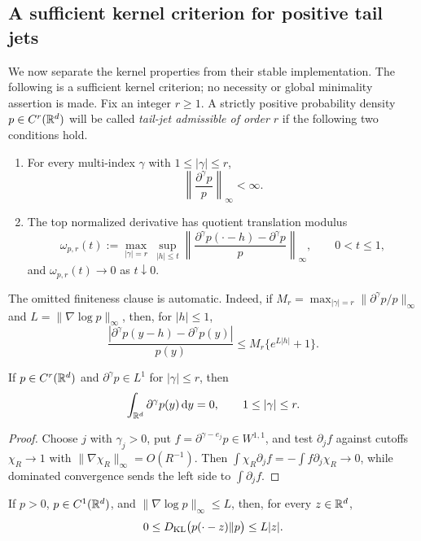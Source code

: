 \subsection{A sufficient kernel criterion for positive tail jets}
\label{subsec:abstract-positive-tail-jet-kernel}

We now separate the kernel properties from their stable implementation.  The
following is a sufficient kernel criterion; no necessity or global
minimality assertion is made.  Fix an integer \(r\ge1\).  A strictly positive
probability density \(p\in C^r(\mathbb{R}^d)\) will be called \emph{tail-jet
admissible of order \(r\)} if the following two conditions hold.
\begin{enumerate}[label=\textup{(K\arabic*)},leftmargin=2.8em]
\item For every multi-index \(\gamma\) with \(1\le|\gamma|\le r\),
\[
 \left\|\frac{\partial^\gamma p}{p}\right\|_\infty<\infty.
\]
\item The top normalized derivative has quotient translation modulus
\[
 \omega_{p,r}(t):=
 \max_{|\gamma|=r}\ \sup_{|h|\le t}
 \left\|\frac{\partial^\gamma p(\mathord\cdot-h)
                   -\partial^\gamma p}{p}\right\|_\infty,
 \qquad 0<t\le1,
\]
and \(\omega_{p,r}(t)\to0\) as \(t\downarrow0\).
\end{enumerate}
The omitted finiteness clause is automatic.  Indeed, if
\(M_r=\max_{|\gamma|=r}\|\partial^\gamma p/p\|_\infty\) and
\(L=\|\nabla\log p\|_\infty\), then, for \(|h|\le1\),
\[
 \frac{|\partial^\gamma p(y-h)-\partial^\gamma p(y)|}{p(y)}
 \le M_r\{e^{L|h|}+1\}.
\]

\begin{lemma}
If \(p\in C^r(\mathbb{R}^d)\) and \(\partial^\gamma p\in L^1\) for
\(|\gamma|\le r\), then
\[
 \int_{\mathbb{R}^d}\partial^\gamma p(y)\,\mathrm{d} y=0,
 \qquad 1\le|\gamma|\le r.
\]
\end{lemma}

\begin{proof}
Choose \(j\) with \(\gamma_j>0\), put
\(f=\partial^{\gamma-e_j}p\in W^{1,1}\), and test
\(\partial_jf\) against cutoffs \(\chi_R\to1\) with
\(\|\nabla\chi_R\|_\infty=O(R^{-1})\).  Then
\(\int\chi_R\partial_jf=-\int f\partial_j\chi_R\to0\), while dominated
convergence sends the left side to \(\int\partial_jf\).
\end{proof}

\begin{lemma}
If \(p>0\), \(p\in C^1(\mathbb{R}^d)\), and
\(\|\nabla\log p\|_\infty\le L\), then, for every \(z\in\mathbb{R}^d\),
\begin{equation}\label{eq:bounded-score-translate-entropy}
 0\le D_{\rm KL}\bigl(p(\mathord\cdot-z)\|p\bigr)\le L|z|.
\end{equation}
\end{lemma}

